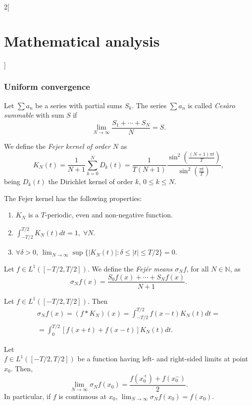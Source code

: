 \documentclass[../../../main.tex]{subfiles}
\begin{document}
\begin{multicols}{2}[\section{Mathematical analysis}]
\subsubsection*{Uniform convergence}
\begin{definition}
Let $\sum a_n$ be a series with partial sums $S_k$. The series $\sum a_n$ is called \textit{Cesàro summable} with sum $S$ if $$\lim_{N\to\infty}\frac{S_1+\cdots+S_N}{N}=S.$$
\end{definition}
\begin{definition}
We define the \textit{Fejer kernel of order $N$} as $$K_N(t)=\frac{1}{N+1}\sum_{k=0}^ND_k(t)=\frac{1}{T(N+1)}\frac{\sin^2\left(\frac{(N+1)\pi t}{T}\right)}{\sin^2\left(\frac{\pi t}{T}\right)},$$ being $D_k(t)$ the Dirichlet kernel of order $k$, $0\leq k\leq N$.
\end{definition}
\begin{prop}
The Fejer kernel has the following properties:
\begin{enumerate}
    \item $K_N$ is a $T$-periodic, even and non-negative function.
    \item $\displaystyle\int_{-T/2}^{T/2}K_N(t)dt=1,\;\forall N$.
    \item $\forall\delta>0$, $\displaystyle\lim_{N\to\infty}\sup\{|K_N(t)|:\delta\leq|t|\leq T/2\}=0$.
\end{enumerate}
\end{prop}
\begin{definition}
Let $f\in L^1([-T/2,T/2])$. We define the \textit{Fejér means $\sigma_Nf$}, for all $N\in\mathbb{N}$, as $$\sigma_Nf(x)=\frac{S_0f(x)+\cdots+S_Nf(x)}{N+1}.$$
\end{definition}
\begin{prop}
Let $f\in L^1([-T/2,T/2])$. Then \begin{multline*}\sigma_Nf(x)=(f*K_N)(x)=\int_{-T/2}^{T/2}f(x-t)K_N(t)dt=\\=\int_0^{T/2}[f(x+t)+f(x-t)]K_N(t)dt.\end{multline*}
\end{prop}
\begin{theorem}
Let \\$f\in L^1([-T/2,T/2])$ be a function having left- and right-sided limits at point $x_0$. Then, $$\lim_{N\to\infty}\sigma_Nf(x_0)=\frac{f(x_0^+)+f(x_0^-)}{2}.$$ In particular, if $f$ is continuous at $x_0$, $\displaystyle\lim_{N\to\infty}\sigma_Nf(x_0)=f(x_0).$
\end{theorem}
\begin{theorem}

\end{theorem}
\end{multicols}
\end{document}
